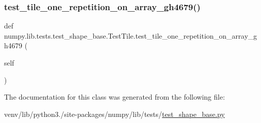 \subsubsection{\texorpdfstring{test\+\_\+tile\+\_\+one\+\_\+repetition\+\_\+on\+\_\+array\+\_\+gh4679()}{test\_tile\_one\_repetition\_on\_array\_gh4679()}}
{\footnotesize\ttfamily def numpy.\+lib.\+tests.\+test\+\_\+shape\+\_\+base.\+Test\+Tile.\+test\+\_\+tile\+\_\+one\+\_\+repetition\+\_\+on\+\_\+array\+\_\+gh4679 (\begin{DoxyParamCaption}\item[{}]{self }\end{DoxyParamCaption})}



The documentation for this class was generated from the following file\+:\begin{DoxyCompactItemize}
\item 
venv/lib/python3./site-\/packages/numpy/lib/tests/\hyperlink{lib_2tests_2test__shape__base_8py}{test\+\_\+shape\+\_\+base.\+py}\end{DoxyCompactItemize}
